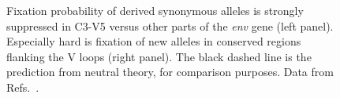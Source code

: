 \documentclass[12pt,a4paper,notitlepage,onecolumn]{article}
\begin{document}
\begin{figure}
\begin{center}
\caption{Fixation probability of derived synonymous alleles is strongly
suppressed in C3-V5 versus other parts of the {\it env} gene (left panel).
Especially hard is fixation of new alleles in conserved regions flanking the V
loops (right panel). The black dashed line is the prediction from neutral
theory, for comparison purposes. Data from
Refs.~\cite{shankarappa_consistent_1999, bunnik_autologous_2008}.}
\end{center}
\end{figure}
\end{document}
